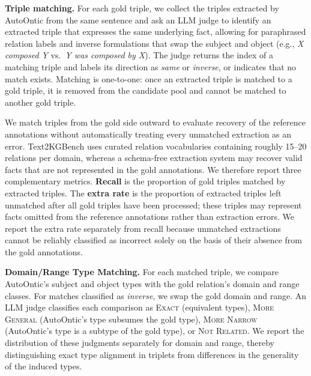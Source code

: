 \documentclass[11pt]{article}
\begin{document}


\textbf{Triple matching.} For each gold triple, we collect the triples extracted by AutoOntic from the same sentence and ask an LLM judge to identify an extracted triple that expresses the same underlying fact, allowing for paraphrased relation labels and inverse formulations that swap the subject and object (e.g., \emph{X composed Y} vs.\ \emph{Y was composed by X}). The judge returns the index of a matching triple and labels its direction as \emph{same} or \emph{inverse}, or indicates that no match exists. Matching is one-to-one: once an extracted triple is matched to a gold triple, it is removed from the candidate pool and cannot be matched to another gold triple.

We match triples from the gold side outward to evaluate recovery of the reference annotations without automatically treating every unmatched extraction as an error. Text2KGBench uses curated relation vocabularies containing roughly 15--20 relations per domain, whereas a schema-free extraction system may recover valid facts that are not represented in the gold annotations. We therefore report three complementary metrics. \textbf{Recall} is the proportion of gold triples matched by extracted triples. The \textbf{extra rate} is the proportion of extracted triples left unmatched after all gold triples have been processed; these triples may represent facts omitted from the reference annotations rather than extraction errors. We report the extra rate separately from recall because unmatched extractions cannot be reliably classified as incorrect solely on the basis of their absence from the gold annotations.

\textbf{Domain/Range Type Matching.} For each matched triple, we compare AutoOntic's subject and object types with the gold relation's domain and range classes. For matches classified as \emph{inverse}, we swap the gold domain and range. An LLM judge classifies each comparison as \textsc{Exact} (equivalent types), \textsc{More General} (AutoOntic's type subsumes the gold type), \textsc{More Narrow} (AutoOntic's type is a subtype of the gold type), or \textsc{Not Related}. We report the distribution of these judgments separately for domain and range, thereby distinguishing exact type alignment in triplets from differences in the generality of the induced types.
\end{document}
